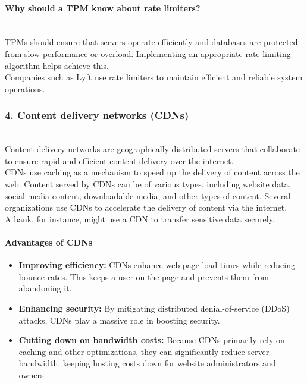 \paragraph{Why should a TPM know about rate limiters?}\label{rHC13m24xguElcoiGtp07}
\\
TPMs should ensure that servers operate efficiently and databases are protected from slow performance or overload. Implementing an appropriate rate-limiting algorithm helps achieve this.
\\
Companies such as Lyft use rate limiters to maintain efficient and reliable system operations.

\subsubsection{4. Content delivery networks (CDNs)}\label{xXnpSjrB-EWPd84UhA4UA}
\\
Content delivery networks are geographically distributed servers that collaborate to ensure rapid and efficient content delivery over the internet.
\\
CDNs use caching as a mechanism to speed up the delivery of content across the web. Content served by CDNs can be of various types, including website data, social media content, downloadable media, and other types of content. Several organizations use CDNs to accelerate the delivery of content via the internet.
\\
A bank, for instance, might use a CDN to transfer sensitive data securely.
\\
\paragraph{Advantages of CDNs}\label{l9E7ieFDcawtgmM_UBMUm}

\begin{itemize}
\item
\protect{}\label{Wqs605n0zADfCmP7Yx0S6}
\textbf{Improving efficiency:} CDNs enhance web page load times while reducing bounce rates. This keeps a user on the page and prevents them from abandoning it.
\item
\protect{}\label{ITU9VE87GMQjzjqLmJuxi}
\textbf{Enhancing security:} By mitigating distributed denial-of-service (DDoS) attacks, CDNs play a massive role in boosting security.
\item
\protect{}\label{JRAB6QrMIqHSw8-Ez1fxD}
\textbf{Cutting down on bandwidth costs:} Because CDNs primarily rely on caching and other optimizations, they can significantly reduce server bandwidth, keeping hosting costs down for website administrators and owners.
\end{itemize}
\\
